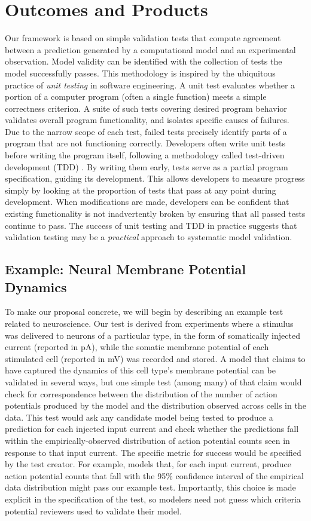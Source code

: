 \documentclass[11pt,letterpaper]{article}
\begin{document}
\section{Outcomes and Products}
Our framework is based on simple validation tests that compute agreement between a prediction generated by a computational model and an experimental observation. Model validity can be identified with the collection of tests the model successfully passes. This methodology is inspired by the ubiquitous practice of \emph{unit testing} in software engineering. A unit test evaluates whether a portion of a computer program (often a single function) meets a simple correctness criterion. A suite of such tests covering desired program behavior validates overall program functionality, and isolates specific causes of failures. Due to the narrow scope of each test, failed tests precisely identify parts of a program that are not functioning correctly. Developers often write unit tests before writing the program itself, following a methodology called test-driven development (TDD) \cite{beck2002}. By writing them early, tests serve as a partial program specification, guiding its development. This allows developers to measure progress simply by looking at the proportion of tests that pass at any point during development. When modifications are made, developers can be confident that existing functionality is not inadvertently broken by ensuring that all passed tests continue to pass.  The success of unit testing and TDD in practice suggests that validation testing may be a \emph{practical} approach to systematic model validation. 

\subsection{Example: Neural Membrane Potential Dynamics} To make our proposal concrete, we will begin by describing an example test related to  neuroscience. Our test is derived from experiments where a stimulus was delivered to neurons of a particular type, in the form of somatically injected current (reported in pA), while the somatic membrane potential of each stimulated cell (reported in mV) was recorded and stored.  A model that claims to have captured the dynamics of this cell type's membrane potential can be validated in several ways, but one simple test (among many) of that claim would check for correspondence between the distribution of the number of action potentials produced by the model and the distribution observed across cells in the data. This test would ask any candidate model being tested to produce a prediction for each injected input current and check whether the predictions fall within the empirically-observed distribution of action potential counts seen in response to that input current.  The specific metric for success would be specified by the test creator.  For example, models that, for each input current, produce action potential counts that fall with the 95\% confidence interval of the empirical data distribution might pass our example test. Importantly, this choice is made explicit in the specification of the test, so modelers need not guess which criteria potential reviewers used to validate their model.
\end{document}

